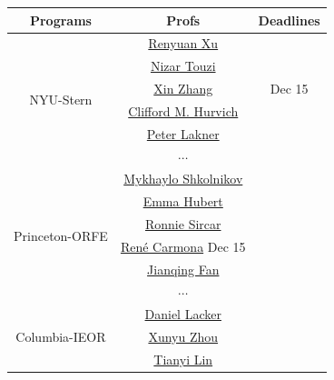 \documentclass{article}
\renewcommand{\arraystretch}{1.5}
\begin{document}
\begin{table}[ht]
    \centering
    \renewcommand{\arraystretch}{1.2}
    \begin{tabular}{|c|c|c|}
        \hline\rowcolor{gray!60!white}
        \textbf{Programs} & \textbf{Profs} &\textbf{Deadlines}\\
        \toprule
        \multirow{6}{10em}{NYU-Stern} 
        & \href{https://engineering.nyu.edu/faculty/renyuan-xu}{Renyuan Xu} & \\
        & \href{https://engineering.nyu.edu/faculty/nizar-touzi}{Nizar Touzi}&  \\
        & \href{https://engineering.nyu.edu/faculty/xin-zhang}{Xin Zhang}  & Dec 15 \\
        & \href{https://www.Stern.nyu.edu/faculty/bio/clifford-m-hurvich}{Clifford M. Hurvich}&  \\
        & \href{https://people.Stern.nyu.edu/plakner/}{Peter Lakner} &\\
        & $\cdots$ & \\
        \bottomrule
        \toprule
        \multirow{6}{10em}{Princeton-ORFE}
        & \href{https://mykhaylo.princeton.edu/}{Mykhaylo Shkolnikov}  & \\
        & \href{https://orfe.princeton.edu/people/emma-hubert}{Emma Hubert}  & \\
        & \href{https://orfe.princeton.edu/people/ronnie-sircar}{Ronnie Sircar}  & \\ 
        & \href{https://orfe.princeton.edu/people/rené-carmona}{René Carmona}   Dec 15& \\
        & \href{https://orfe.princeton.edu/people/jianqing-fan}{Jianqing Fan}  & \\
        & $\cdots$& \\
        \bottomrule
        \toprule
        \multirow{7}{10em}{Columbia-IEOR}
         & \href{https://ieor.columbia.edu/content/daniel-lacker}{Daniel Lacker}  & \\
        & \href{https://www.engineering.columbia.edu/faculty-directory/xunyu-zhou}{Xunyu Zhou}  & \\
        & \href{https://ieor.columbia.edu/content/tianyi-lin}{Tianyi Lin}  & \\

\end{tabular}
\end{table}
\end{document}
